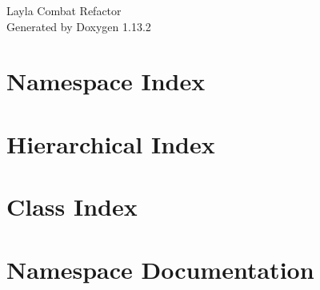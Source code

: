 \documentclass[twoside]{book}
\newcommand{\+}{\discretionary{\mbox{\scriptsize$\hookleftarrow$}}{}{}}
\newcommand{\clearemptydoublepage}{%
    \newpage{\pagestyle{empty}\cleardoublepage}%
  }
\begin{document}
  \raggedbottom
    \hypersetup{pageanchor=false,
                bookmarksnumbered=true,
                pdfencoding=unicode
               }
  \begin{titlepage}
  \vspace*{7cm}
  \begin{center}%
  {\Large Layla Combat Refactor}\\
  \vspace*{1cm}
  {\large Generated by Doxygen 1.13.2}\\
  \end{center}
  \end{titlepage}
  \clearemptydoublepage
  \tableofcontents
  \clearemptydoublepage
  \hypersetup{pageanchor=true}
\chapter{Namespace Index}

\chapter{Hierarchical Index}

\chapter{Class Index}

\chapter{Namespace Documentation}






\end{document}
